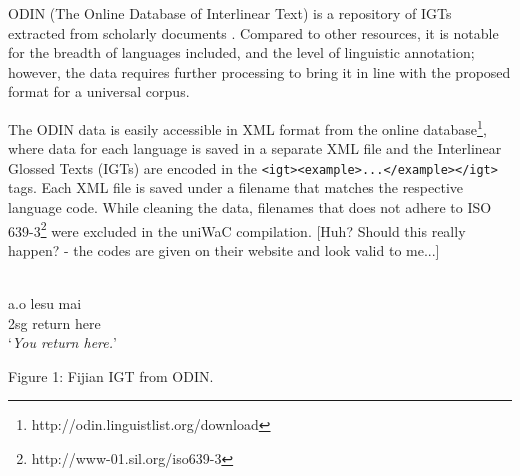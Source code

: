 \documentclass[11pt]{article}
\begin{document}
ODIN (The Online Database of Interlinear Text) is a repository of IGTs extracted from scholarly documents \cite{lewis2006odin,lewis2010odin}.  Compared to other resources, it is notable for the breadth of languages included, and the level of linguistic annotation; however, the data requires further processing to bring it in line with the proposed format for a universal corpus.

The ODIN data is easily accessible in XML format from the online database\footnote{http://odin.linguistlist.org/download}, where data for each language is saved in a separate XML file and the Interlinear Glossed Texts (IGTs) are encoded in the \texttt{<igt><example>...</example></igt>} tags. Each XML file is saved under a filename that matches the respective language code. While cleaning the data, filenames that does not adhere to ISO 639-3\footnote{http://www-01.sil.org/iso639-3} were excluded in the uniWaC compilation. [Huh? Should this really happen? - the codes are given on their website and look valid to me...]
\\ \\
\begin{minipage}{\columnwidth}

 a.\quad o lesu mai \\
\indent \qquad\qquad 2sg return here \\
\indent \qquad\qquad `\emph{You return here.}' \\
\centerline{Figure 1: Fijian IGT from ODIN.}
\end{minipage}

\end{document}

